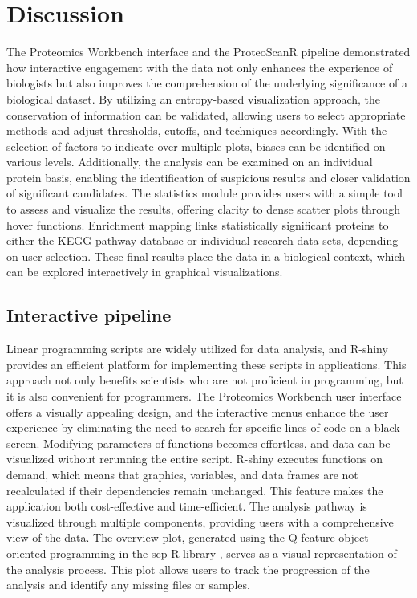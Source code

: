 \documentclass[
  11pt,
]{article}
\begin{document}
\newpage

\hypertarget{discussion}{%
\section{Discussion}\label{discussion}}

The Proteomics Workbench interface and the ProteoScanR pipeline demonstrated how interactive engagement with the data not only enhances the experience of biologists but also improves the comprehension of the underlying significance of a biological dataset. By utilizing an entropy-based visualization approach, the conservation of information can be validated, allowing users to select appropriate methods and adjust thresholds, cutoffs, and techniques accordingly. With the selection of factors to indicate over multiple plots, biases can be identified on various levels. Additionally, the analysis can be examined on an individual protein basis, enabling the identification of suspicious results and closer validation of significant candidates. The statistics module provides users with a simple tool to assess and visualize the results, offering clarity to dense scatter plots through hover functions. Enrichment mapping links statistically significant proteins to either the KEGG pathway database or individual research data sets, depending on user selection. These final results place the data in a biological context, which can be explored interactively in graphical visualizations.

\hypertarget{interactive-pipeline}{%
\subsection{Interactive pipeline}\label{interactive-pipeline}}

Linear programming scripts are widely utilized for data analysis, and R-shiny provides an efficient platform for implementing these scripts in applications. This approach not only benefits scientists who are not proficient in programming, but it is also convenient for programmers. The Proteomics Workbench user interface offers a visually appealing design, and the interactive menus enhance the user experience by eliminating the need to search for specific lines of code on a black screen. Modifying parameters of functions becomes effortless, and data can be visualized without rerunning the entire script. R-shiny executes functions on demand, which means that graphics, variables, and data frames are not recalculated if their dependencies remain unchanged. This feature makes the application both cost-effective and time-efficient.
The analysis pathway is visualized through multiple components, providing users with a comprehensive view of the data. The overview plot, generated using the Q-feature object-oriented programming in the scp R library \citep{Vanderaa2021}, serves as a visual representation of the analysis process. This plot allows users to track the progression of the analysis and identify any missing files or samples.
\end{document}
